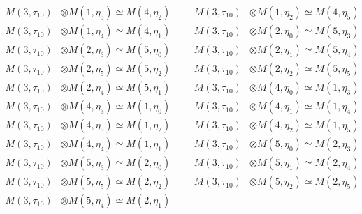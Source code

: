 \begin{align*}
M(3,\tau_{10}) &\otimes M(1,\eta_{5}) \simeq M(4,\eta_{2}) &&& M(3,\tau_{10}) &\otimes M(1,\eta_{2}) \simeq M(4,\eta_{5})\\
M(3,\tau_{10}) &\otimes M(1,\eta_{4}) \simeq M(4,\eta_{1}) &&& M(3,\tau_{10}) &\otimes M(2,\eta_{0}) \simeq M(5,\eta_{3})\\
M(3,\tau_{10}) &\otimes M(2,\eta_{3}) \simeq M(5,\eta_{0}) &&& M(3,\tau_{10}) &\otimes M(2,\eta_{1}) \simeq M(5,\eta_{4})\\
M(3,\tau_{10}) &\otimes M(2,\eta_{5}) \simeq M(5,\eta_{2}) &&& M(3,\tau_{10}) &\otimes M(2,\eta_{2}) \simeq M(5,\eta_{5})\\
M(3,\tau_{10}) &\otimes M(2,\eta_{4}) \simeq M(5,\eta_{1}) &&& M(3,\tau_{10}) &\otimes M(4,\eta_{0}) \simeq M(1,\eta_{3})\\
M(3,\tau_{10}) &\otimes M(4,\eta_{3}) \simeq M(1,\eta_{0}) &&& M(3,\tau_{10}) &\otimes M(4,\eta_{1}) \simeq M(1,\eta_{4})\\
M(3,\tau_{10}) &\otimes M(4,\eta_{5}) \simeq M(1,\eta_{2}) &&& M(3,\tau_{10}) &\otimes M(4,\eta_{2}) \simeq M(1,\eta_{5})\\
M(3,\tau_{10}) &\otimes M(4,\eta_{4}) \simeq M(1,\eta_{1}) &&& M(3,\tau_{10}) &\otimes M(5,\eta_{0}) \simeq M(2,\eta_{3})\\
M(3,\tau_{10}) &\otimes M(5,\eta_{3}) \simeq M(2,\eta_{0}) &&& M(3,\tau_{10}) &\otimes M(5,\eta_{1}) \simeq M(2,\eta_{4})\\
M(3,\tau_{10}) &\otimes M(5,\eta_{5}) \simeq M(2,\eta_{2}) &&& M(3,\tau_{10}) &\otimes M(5,\eta_{2}) \simeq M(2,\eta_{5})\\
M(3,\tau_{10}) &\otimes M(5,\eta_{4}) \simeq M(2,\eta_{1})
\end{align*}

